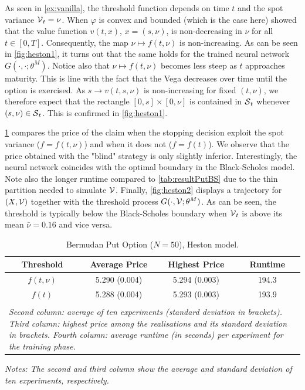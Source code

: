 As seen in \cref{ex:vanilla}, the threshold function 
depends on time $t$ and the spot variance $\operatorname{\mathcal{V}}_t =\nu$.  
When $\varphi$ is convex and bounded (which is the case here)   \citet{LambertonHeston} showed that the value function $v(t,x)$, $x=(s,\nu)$, is  non-decreasing in $\nu$ for all $t\in [0,T]$. Consequently, the map $\nu \mapsto f(t,\nu)$ is non-increasing. As can be seen in  \cref{fig:heston1}, it turns out that the same holds for the trained neural network $G(\cdot,\cdot;\theta^M)$.
Notice also that $\nu \mapsto f(t,\nu)$ becomes less steep as $t$ approaches maturity. This is line with the fact that the Vega  decreases over time until the option is exercised.  
As $s \to v(t,s,\nu)$ is non-increasing for fixed $(t,\nu)$,  we therefore expect that the  rectangle $[0,s]\times [0,\nu]$ 
is contained in $\operatorname{\mathcal{S}}_t$ whenever $(s,\nu) \in \operatorname{\mathcal{S}}_t$. This is confirmed in  \cref{fig:heston1}. 

 \cref{tab:resultPutHeston} compares the price of the claim when the stopping decision exploit the spot variance ($f = f(t,\nu)$) and when it does not ($f = f(t)$). We observe that the price obtained with the "blind" strategy is only slightly inferior. Interestingly, the neural network coincides with the optimal boundary in the Black-Scholes model.  Note also the longer runtime compared to \cref{tab:resultPutBS} due to the thin partition needed to simulate $\operatorname{\mathcal{V}}$. %
 Finally, \cref{fig:heston2} displays a trajectory for $(X,\operatorname{\mathcal{V}})$ together with the threshold process $G(\cdot,\operatorname{\mathcal{V}};\theta^M)$. As can be seen, the threshold is typically below the Black-Scholes boundary when $\operatorname{\mathcal{V}}_t$ is above its mean $\bar{\nu} = 0.16$ and vice versa. 

\begin{table}[ht]
  \centering
  \caption{Bermudan Put Option ($N=50$), Heston model.}  
 
 \vspace{-2mm}
 
  \begin{tabular}{c c c c }
 \hline  \hline
  Threshold &  Average Price& Highest Price & Runtime  \\
  \hline  \hline
    $f(t,\nu)$ & 5.290 (0.004) & 5.294 (0.003) &  194.3 \\
  $f(t)$ & 5.288 (0.004) & 5.293 (0.003) &  193.9  \\
  \hline\\[-1em]
    
  \multicolumn{4}{l}{%
  \begin{minipage}{9.cm}%
    \tiny \textit{Second  column:  average  of ten experiments (standard deviation in brackets). Third column: highest price  among the realisations and its standard deviation in brackets.  Fourth column:  average runtime (in seconds) per experiment for the training phase.}%
  \end{minipage} }
\end{tabular}
\vspace{2mm}

\scriptsize{
\textit{Notes: The second and third column show the average and standard deviation of ten experiments, respectively. }}
\label{tab:resultPutHeston}
  \end{table}
  

